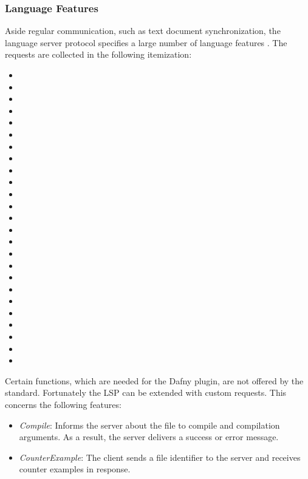 \subsubsection{Language Features}
Aside regular communication, such as text document synchronization,
the language server protocol specifies a large number of language features \cite{lspspec}.
The requests are collected in the following itemization:

\begin{multicols}{3}
\begin{itemize}
    \item {}
    \item {}
    \item {}
    \item {}
    \item {}
    \item {}
    \item {}
    \item {}
    \item {}
    \item {}
    \item {}
    \item {}
    \item {}
    \item {}
    \item {}
    \item {}
    \item {}
    \item {}
    \item {}
    \item {}
    \item {}
    \item {}
    \item {}
    \item {}
    \item {}
\end{itemize}
\end{multicols}

Certain functions, which are needed for the Dafny plugin, are not offered by the standard.
Fortunately the LSP can be extended with custom requests. This concerns the following features:
\begin{itemize}
    \item \textit{Compile}: Informs the server about the file to compile and compilation arguments.
          As a result, the server delivers a success or error message.
    \item \textit{CounterExample}: The client sends a file identifier to the server and receives
           counter examples in response.
\end{itemize}

